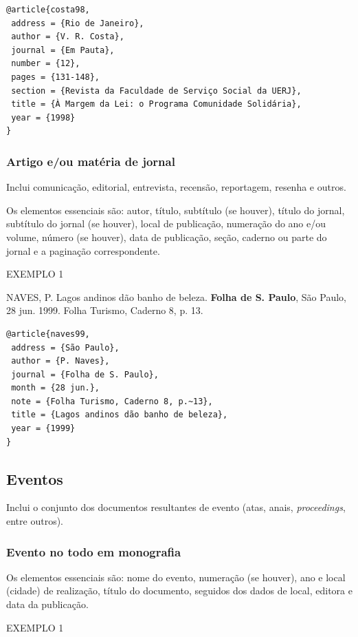 \begin{verbatim}
@article{costa98,
 address = {Rio de Janeiro},
 author = {V. R. Costa},
 journal = {Em Pauta},
 number = {12},
 pages = {131-148},
 section = {Revista da Faculdade de Serviço Social da UERJ},
 title = {À Margem da Lei: o Programa Comunidade Solidária},
 year = {1998}
}
\end{verbatim}

\subsubsection{Artigo e/ou matéria de jornal}

Inclui comunicação, editorial, entrevista, recensão, reportagem, resenha e outros.

Os elementos essenciais são: autor, título, subtítulo (se houver), título do jornal, subtítulo do jornal (se houver), local de publicação, numeração do ano e/ou volume, número (se houver), data de publicação, seção, caderno ou parte do jornal e a paginação correspondente. 

EXEMPLO 1 

NAVES, P. Lagos andinos dão banho de beleza. \textbf{Folha de S. Paulo}, São Paulo, 28 jun. 1999. Folha Turismo, Caderno 8, p. 13.

\begin{verbatim}
@article{naves99,
 address = {São Paulo},
 author = {P. Naves},
 journal = {Folha de S. Paulo},
 month = {28 jun.},
 note = {Folha Turismo, Caderno 8, p.~13},
 title = {Lagos andinos dão banho de beleza},
 year = {1999}
}
\end{verbatim}

\subsection{Eventos}

Inclui o conjunto dos documentos resultantes de evento (atas, anais, \textit{proceedings}, entre outros).

\subsubsection{Evento no todo em monografia}

Os elementos essenciais são: nome do evento, numeração (se houver), ano e local (cidade) de realização, título do documento, seguidos dos dados de local, editora e data da publicação. 

EXEMPLO 1

